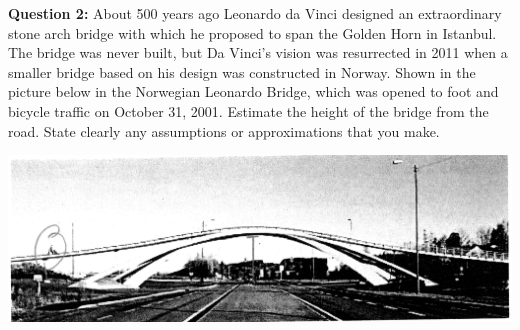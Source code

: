 \documentclass{article}
\begin{document}
\newpage
\textbf{Question 2:} About 500 years ago Leonardo da Vinci designed an extraordinary stone arch bridge with which he proposed to span the Golden Horn in Istanbul. The bridge was never built, but Da Vinci's vision was resurrected in 2011 when a smaller bridge based on his design was constructed in Norway. Shown in the picture below in the Norwegian Leonardo Bridge, which was opened to foot and bicycle traffic on October 31, 2001. Estimate the height of the bridge from the road. State clearly any assumptions or approximations that you make.
\begin{center}
    \includegraphics[width=0.8\linewidth]{2011-2-2.png}
\end{center}

\newpage
\end{document}
